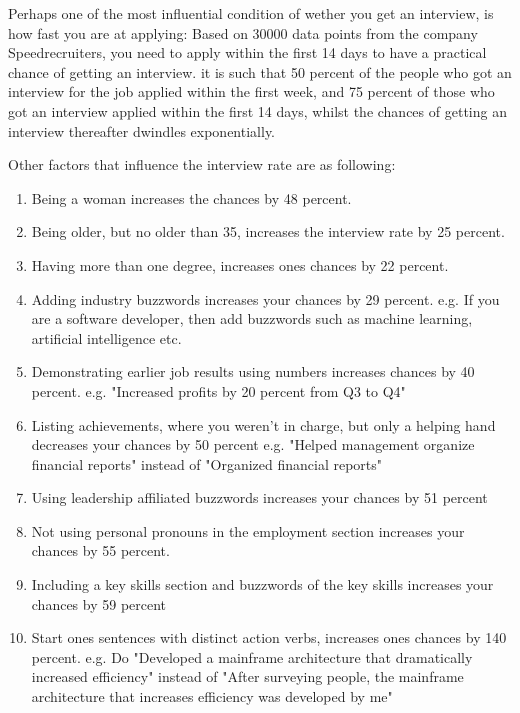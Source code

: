 Perhaps one of the most influential condition of wether you get an interview,
is how fast you are at applying:
Based on 30000 data points from the company Speedrecruiters, you need
to apply within the first 14 days to have a practical chance of getting an
interview. it is such that 50 percent of the people who got an interview
for the job applied within the first week, and 75 percent of those who
got an interview applied within the first 14 days, whilst the chances of
getting an interview thereafter dwindles exponentially.

Other factors that influence the interview rate are as following:
\begin{enumerate}
\item Being a woman increases the chances by 48 percent.
\item Being older, but no older than 35, increases the interview rate by 25 percent.
\item Having more than one degree, increases ones chances by 22 percent.
\item Adding industry buzzwords increases your chances by 29 percent.
   e.g. If you are a software developer, then add buzzwords such as machine learning,
   artificial intelligence etc.
\item Demonstrating earlier job results using numbers increases chances by 40 percent.
   e.g. "Increased profits by 20 percent from Q3 to Q4"
\item Listing achievements, where you weren't in charge, but only a helping hand
 decreases your chances by 50 percent
   e.g. "Helped management organize financial reports" instead of "Organized financial reports"
\item Using leadership affiliated buzzwords increases your chances by 51 percent
\item Not using personal pronouns in the employment section increases your
chances by 55 percent.
\item Including a key skills section and buzzwords of the key skills increases your
 chances by 59 percent
\item Start ones sentences with distinct action verbs, increases ones chances by 140 percent.
   e.g. Do "Developed a mainframe architecture that dramatically increased efficiency"
   instead of "After surveying people, the mainframe architecture that increases efficiency was
   developed by me"
\end{enumerate}



